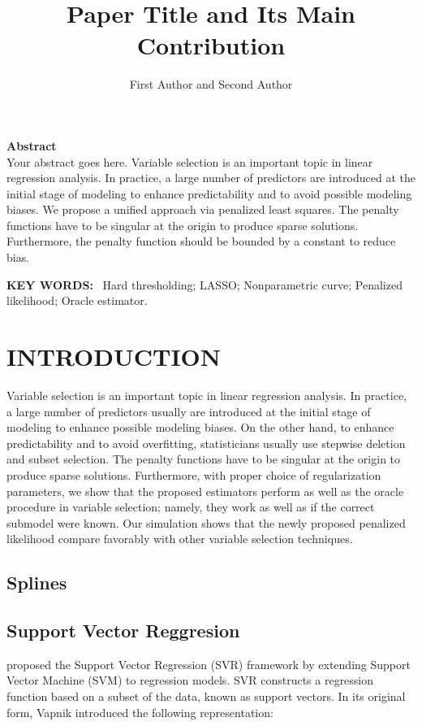 \documentclass[8pt,twocolumn]{article}
\title{\textbf{Paper Title and Its Main Contribution}}
\author{First Author and Second Author\\
}
\date{}
\newenvironment{abstractbox}{%
  \begin{mdframed}[backgroundcolor=lightgray,
                   linewidth=0.5pt,
                   linecolor=black,
                   topline=true,
                   bottomline=true,
                   leftline=true,
                   rightline=true,
                   innerleftmargin=10pt,
                   innerrightmargin=10pt,
                   innertopmargin=10pt,
                   innerbottommargin=10pt]
}{%
  \end{mdframed}
}
\begin{document}
\maketitle

\begin{abstractbox}
\noindent\textbf{Abstract} \\
Your abstract goes here. Variable selection is an important topic in linear regression analysis. In practice, a large number of predictors are introduced at the initial stage of modeling to enhance predictability and to avoid possible modeling biases. We propose a unified approach via penalized least squares. The penalty functions have to be singular at the origin to produce sparse solutions. Furthermore, the penalty function should be bounded by a constant to reduce bias.

\vspace{0.5em}
\noindent\textbf{KEY WORDS:} \ Hard thresholding; LASSO; Nonparametric curve; Penalized likelihood; Oracle estimator.
\end{abstractbox}


\section{INTRODUCTION}

Variable selection is an important topic in linear regression analysis. In practice, a large number of predictors usually are introduced at the initial stage of modeling to enhance possible modeling biases. On the other hand, to enhance predictability and to avoid overfitting, statisticians usually use stepwise deletion and subset selection. The penalty functions have to be singular at the origin to produce sparse solutions. Furthermore, with proper choice of regularization parameters, we show that the proposed estimators perform as well as the oracle procedure in variable selection; namely, they work as well as if the correct submodel were known. Our simulation shows that the newly proposed penalized likelihood compare favorably with other variable selection techniques.

\subsection{Splines}

\subsection{Support Vector Reggresion}
\citet{vapnik1995nature} proposed the Support Vector Regression (SVR) framework by extending Support Vector Machine (SVM) to regression models. SVR constructs a regression function based on a subset of the data, known as support vectors. In its original form, Vapnik introduced the following representation:
\end{document}
